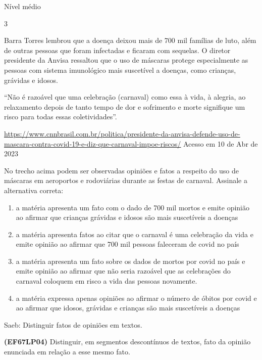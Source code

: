 {Nível médio

\num{3}

Barra Torres lembrou que a doença deixou mais de 700 mil famílias de
luto, além de outras pessoas que foram infectadas e ficaram com
sequelas. O diretor presidente da Anvisa ressaltou que o uso de máscaras
protege especialmente as pessoas com sistema imunológico mais suscetível
a doenças, como crianças, grávidas e idosos.

``Não é razoável que uma celebração (carnaval) como essa à vida, à
alegria, ao relaxamento depois de tanto tempo de dor e sofrimento e
morte signifique um risco para todas essas coletividades''.

\href{https://www.cnnbrasil.com.br/politica/presidente-da-anvisa-defende-uso-de-mascara-contra-covid-19-e-diz-que-carnaval-impoe-riscos/}{\uline{https://www.cnnbrasil.com.br/politica/presidente-da-anvisa-defende-uso-de-mascara-contra-covid-19-e-diz-que-carnaval-impoe-riscos/}}
Acesso em 10 de Abr de 2023

No trecho acima podem ser observadas opiniões e fatos a respeito do uso
de máscaras em aeroportos e rodoviárias durante as festas de carnaval.
Assinale a alternativa correta:

\begin{enumerate}
\def\labelenumi{\alph{enumi})}
\item
  a matéria apresenta um fato com o dado de 700 mil mortos e emite
  opinião ao afirmar que crianças grávidas e idosos são mais suscetíveis
  a doenças
\item
  a matéria apresenta fatos ao citar que o carnaval é uma celebração da
  vida e emite opinião ao afirmar que 700 mil pessoas faleceram de covid
  no país
\item
  a matéria apresenta um fato sobre os dados de mortos por covid no país
  e emite opinião ao afirmar que não seria razoável que as celebrações
  do carnaval coloquem em risco a vida das pessoas novamente.
\item
  a matéria expressa apenas opiniões ao afirmar o número de óbitos por
  covid e ao afirmar que idosos, grávidas e crianças são mais
  suscetíveis a doenças
\end{enumerate}

Saeb: Distinguir fatos de opiniões em textos.

\textbf{(EF67LP04)} Distinguir, em segmentos descontínuos de textos,
fato da opinião enunciada em relação a esse mesmo fato.

}
